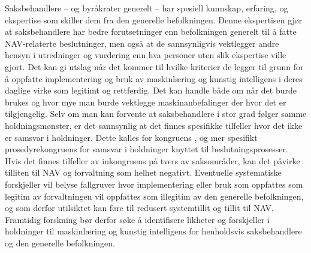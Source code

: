 \documentclass[
]{book}
\begin{document}
Saksbehandlere -- og byråkrater generelt -- har spesiell kunnskap, erfaring, og ekspertise som skiller dem fra den generelle befolkningen.
Denne ekspertisen gjør at saksbehandlere har bedre forutsetninger enn befolkningen generelt til å fatte NAV-relaterte beslutninger, men også at de sannsynligvis vektlegger andre hensyn i utredninger og vurdering enn hva personer uten slik ekspertise ville gjort.
Det kan gi utslag når det kommer til hvilke kriterier de legger til grunn for å oppfatte implementering og bruk av maskinlæring og kunstig intelligens i deres daglige virke som legitimt og rettferdig.
Det kan handle både om når det burde brukes og hvor mye man burde vektlegge maskinanbefalinger der hvor det er tilgjengelig.
Selv om man kan forvente at saksbehandlere i stor grad følger samme holdningsmønster, er det sannsynlig at det finnes spesifikke tilfeller hvor det ikke er samsvar i holdninger.
Dette kalles for kongruens \citep{golder2010ideological}, og mer spesifikt prosedyrekongruens for samsvar i holdninger knyttet til beslutningsprosesser.
Hvis det finnes tilfeller av inkongruens på tvers av saksområder, kan det påvirke tilliten til NAV og forvaltning som helhet negativt.
Eventuelle systematiske forskjeller vil belyse fallgruver hvor implementering eller bruk som oppfattes som legitim av forvaltningen vil oppfattes som illegitim av den generelle befolkningen, og som derfor utilsiktet kan føre til redusert systemtillit og tillit til NAV.
Framtidig forskning bør derfor søke å identifisere likheter og forskjeller i holdninger til maskinlæring og kunstig intelligens for henholdsvis saksbehandlere og den generelle befolkningen.

  
\end{document}
